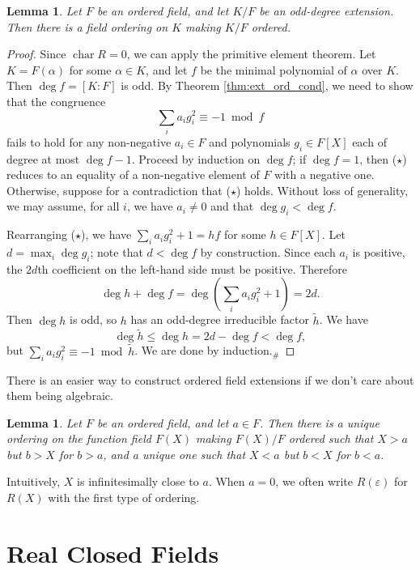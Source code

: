 \documentclass[a4paper]{report}
\newtheorem{lemma}[theorem]{Lemma}
\theoremstyle{definition}
\DeclareMathOperator{\ch}{char}
\newcommand{\eps}[0]{\varepsilon}
\begin{document}
\begin{lemma}
  \label{lem:ext_ord_odd_deg}
  Let $F$ be an ordered field, and let $K/F$ be an odd-degree extension. Then there is a field ordering on $K$ making $K/F$ ordered.
\end{lemma}
\begin{proof}
  Since $\ch R=0$, we can apply the primitive element theorem. Let $K=F(\alpha)$ for some $\alpha\in K$, and let $f$ be the minimal polynomial of $\alpha$ over $K$. Then $\deg f=[K:F]$ is odd. By Theorem \ref{thm:ext_ord_cond}, we need to show that the congruence
  \[\sum_ia_ig_i^2\equiv-1\bmod f\tag{$\star$}\]
  fails to hold for any non-negative $a_i\in F$ and polynomials $g_i\in F[X]$ each of degree at most $\deg f-1$. Proceed by induction on $\deg f$; if $\deg f=1$, then ($\star$) reduces to an equality of a non-negative element of $F$ with a negative one. Otherwise, suppose for a contradiction that ($\star$) holds. Without loss of generality, we may assume, for all $i$, we have $a_i\neq0$ and that $\deg g_i<\deg f$.
  
  Rearranging ($\star$), we have $\sum_ia_ig_i^2+1=hf$ for some $h\in F[X]$. Let $d=\max_i\deg g_i$; note that $d<\deg f$ by construction. Since each $a_i$ is positive, the $2d$th coefficient on the left-hand side must be positive. Therefore
  \[\deg h+\deg f=\deg\left(\sum_ia_ig_i^2+1\right)=2d.\]
  Then $\deg h$ is odd, so $h$ has an odd-degree irreducible factor $\tilde h$. We have
  \[\deg\tilde h\leq\deg h=2d-\deg f<\deg f,\]
  but $\sum_ia_ig_i^2\equiv-1\bmod\tilde h$. We are done by induction.$_\#$
\end{proof}

There is an easier way to construct ordered field extensions if we don't care about them being algebraic.

\begin{lemma}
  \label{lem:order_fun_field}
  Let $F$ be an ordered field, and let $a\in F$. Then there is a unique ordering on the function field $F(X)$ making $F(X)/F$ ordered such that $X>a$ but $b>X$ for $b>a$, and a unique one such that $X<a$ but $b<X$ for $b<a$.
\end{lemma}

Intuitively, $X$ is infinitesimally close to $a$. When $a=0$, we often write $R(\eps)$ for $R(X)$ with the first type of ordering.

\section{Real Closed Fields}
\end{document}
